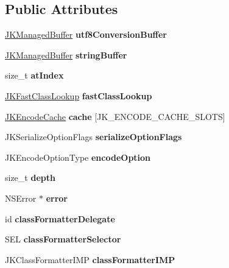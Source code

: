 \subsection*{Public Attributes}
\begin{DoxyCompactItemize}
\item 
\mbox{\label{structJKEncodeState_a1b0aea46e1e8d3c3c1a10c717b62e594}} 
\hyperlink{structJKManagedBuffer}{J\+K\+Managed\+Buffer} {\bfseries utf8\+Conversion\+Buffer}
\item 
\mbox{\label{structJKEncodeState_a75a3a02fa81cbff32df3dd039bb1516e}} 
\hyperlink{structJKManagedBuffer}{J\+K\+Managed\+Buffer} {\bfseries string\+Buffer}
\item 
\mbox{\label{structJKEncodeState_a74e949afd40d30d6bf3f90283fce0ffb}} 
size\+\_\+t {\bfseries at\+Index}
\item 
\mbox{\label{structJKEncodeState_afa5f38579b9be63a088d6e7633280998}} 
\hyperlink{structJKFastClassLookup}{J\+K\+Fast\+Class\+Lookup} {\bfseries fast\+Class\+Lookup}
\item 
\mbox{\label{structJKEncodeState_a0ef51a24eff707dcbf33ae7247214d21}} 
\hyperlink{structJKEncodeCache}{J\+K\+Encode\+Cache} {\bfseries cache} \mbox{[}J\+K\+\_\+\+E\+N\+C\+O\+D\+E\+\_\+\+C\+A\+C\+H\+E\+\_\+\+S\+L\+O\+TS\mbox{]}
\item 
\mbox{\label{structJKEncodeState_ac12503e3307839b27c7d91e1fcb503c8}} 
J\+K\+Serialize\+Option\+Flags {\bfseries serialize\+Option\+Flags}
\item 
\mbox{\label{structJKEncodeState_a8f92a733bcd0a24441b86fdf44746a2b}} 
J\+K\+Encode\+Option\+Type {\bfseries encode\+Option}
\item 
\mbox{\label{structJKEncodeState_a0f95ac1d47e8408d4108e12d226b6fc2}} 
size\+\_\+t {\bfseries depth}
\item 
\mbox{\label{structJKEncodeState_a06a37dda06467b599ec7b24093b4982f}} 
N\+S\+Error $\ast$ {\bfseries error}
\item 
\mbox{\label{structJKEncodeState_a15a9d6710ae0bd0851fcc7d9756768a6}} 
id {\bfseries class\+Formatter\+Delegate}
\item 
\mbox{\label{structJKEncodeState_ad29de3691eba8128cd70cc5f362f60d0}} 
S\+EL {\bfseries class\+Formatter\+Selector}
\item 
\mbox{\label{structJKEncodeState_a8f58e19530ef145df0ecf1ac35865d2e}} 
J\+K\+Class\+Formatter\+I\+MP {\bfseries class\+Formatter\+I\+MP}
\end{DoxyCompactItemize}


